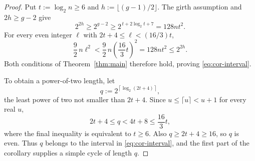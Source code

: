 \documentclass[11pt,a4paper]{article}
\begin{document}
\begin{proof}
Put $t:=\log_2 n\ge6$ and
$h:=\lfloor(g-1)/2\rfloor$. The girth assumption and $2h\ge g-2$
give
\begin{equation}\label{eq:cor-girth}
  2^{2h}\ge2^{g-2}
  \ge2^{\,t+2\log_2 t+7}
  =128nt^2.
\end{equation}
For every even integer $\ell$ with $2t+4\le\ell<(16/3)t$,
\[
  \frac92\,n\ell^2
  <\frac92\,n\left(\frac{16}{3}t\right)^2
  =128nt^2
  \le2^{2h}.
\]
Both conditions of Theorem~\ref{thm:main} therefore hold, proving
\eqref{eq:cor-interval}.

To obtain a power-of-two length, let
\[
  q:=2^{\left\lceil\log_2(2t+4)\right\rceil},
\]
the least power of two not smaller than $2t+4$. Since
$u\le\lceil u\rceil<u+1$ for every real $u$,
\[
  2t+4\le q<4t+8\le\frac{16}{3}t,
\]
where the final inequality is equivalent to $t\ge6$.
Also $q\ge2t+4\ge16$, so $q$ is even.
Thus $q$ belongs to the interval in \eqref{eq:cor-interval}, and the
first part of the corollary supplies a simple cycle of length $q$.
\end{proof}
\end{document}
